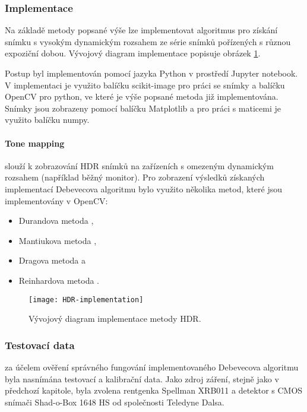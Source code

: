 \subsubsection{Implementace}
Na základě metody popsané výše lze implementovat algoritmus pro získání snímku s vysokým dynamickým rozsahem ze série snímků pořízených s různou expoziční dobou. Vývojový diagram implementace popisuje obrázek \ref{fig:HDR-implementation}.

Postup byl implementován pomocí jazyka Python v prostředí Jupyter notebook. V implementaci je využito balíčku scikit-image pro práci se snímky a balíčku OpenCV pro python, ve které je výše popsané metoda již implementována. Snímky jsou zobrazeny pomocí balíčku Matplotlib a pro práci s maticemi je využito balíčku numpy. 

\paragraph{Tone mapping} slouží k zobrazování HDR snímků na zařízeních s omezeným dynamickým rozsahem (například běžný monitor). Pro zobrazení výsledků získaných implementací Debevecova algoritmu bylo využito několika metod, které jsou implementovány v OpenCV:
\begin{itemize}
\item Durandova metoda \cite{Durand},
\item Mantiukova metoda \cite{Mantiuk},
\item Dragova metoda \cite{Drago} a
\item Reinhardova metoda \cite{Mantiuk}.
\end{itemize}

\begin{figure}[!htb]
\centering
\texttt{[image: HDR-implementation]}
\caption{Vývojový diagram implementace metody HDR.}
\label{fig:HDR-implementation}
\end{figure}

\subsubsection{Testovací data}
za účelem ověření správného fungování implementovaného Debevecova algoritmu byla nasnímána testovací a kalibrační data. Jako zdroj záření, stejně jako v předchozí kapitole, byla zvolena rentgenka Spellman XRB011 a detektor s CMOS snímači Shad-o-Box 1648 HS \cite{SB1548HS} od společnosti Teledyne Dalsa.


